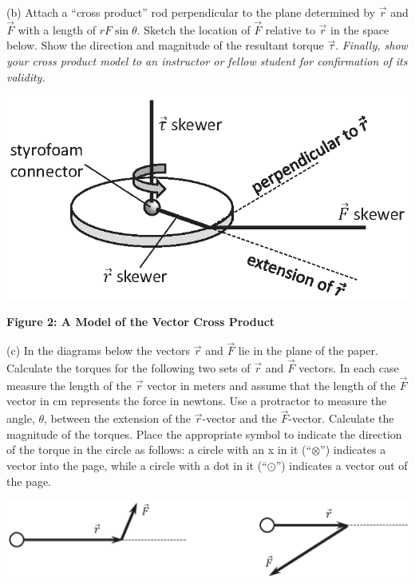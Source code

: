 (b) Attach a ``cross product'' rod perpendicular to the plane
determined by \( {\vec  r} \) and \( {\vec  F} \) with a
length of $rF\sin \theta$. Sketch the location of \( {\vec  F} \)
relative to \( {\vec  r} \) in the space below. Show the direction
and magnitude of the resultant torque \( {\vec{\tau} } \). \textit{Finally,
show your cross product model to an instructor or fellow student for confirmation
of its validity. }

{\par\centering \includegraphics[scale=0.9]{ang_mom/ang_mom_fig4_new.eps} \par}
\vspace{0.3cm}

\textbf{Figure 2: A Model of the Vector Cross Product}

(c) In the diagrams below the vectors \( {\vec  r} \) and \( {\vec  F} \)
lie in the plane of the paper. Calculate the torques for the following two sets
of \( {\vec  r} \) and \( {\vec  F} \) vectors. In each
case measure the length of the \( {\vec  r} \) vector in meters and
assume that the length of the \( {\vec  F} \) vector in cm represents
the force in newtons. Use a protractor to measure the angle, \( \theta  \),
between the extension of the \( {\vec  r} \)-vector and the \( {\vec  F} \)-vector.
Calculate the magnitude of the torques. Place the appropriate symbol to indicate
the direction of the torque in the circle as follows: a circle with an x in
it (``$\otimes$'') indicates a vector into the page, while a circle with a dot in it (``$\odot$'') indicates
a vector out of the page.

\vspace{0.3cm}
{\par\centering \includegraphics{ang_mom/ang_mom_fig5_new.eps} \par}
\vspace{0.3cm}

